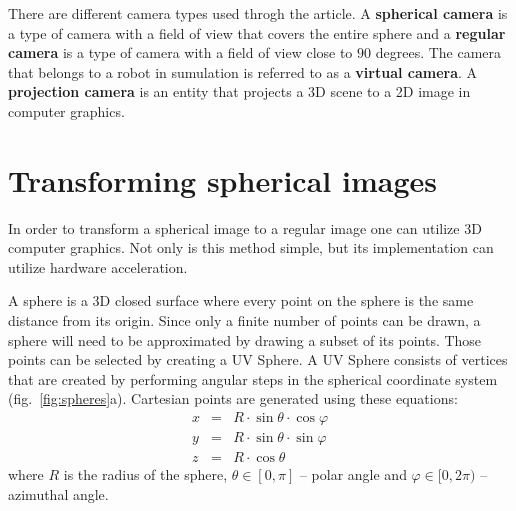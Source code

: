 \documentclass{svproc}
\begin{document}
There are different camera types used throgh the article. A \textbf{spherical camera} is a type of camera with a field of view that covers the entire sphere and a \textbf{regular camera} is a type of camera with a field of view close to $90$ degrees.
The camera that belongs to a robot in sumulation is referred to as a \textbf{virtual camera}.
A \textbf{projection camera} is an entity that projects a 3D scene to a 2D image in computer graphics.




\section{Transforming spherical images}
\label{sec:spherical}

In order to transform a spherical image to a regular image one can utilize 3D computer graphics.
Not only is this method simple, but its implementation can utilize hardware acceleration.

A sphere is a 3D closed surface where every point on the sphere is the same distance from its origin.
Since only a finite number of points can be drawn, a sphere will need to be approximated by drawing a subset of its points.
Those points can be selected by creating a UV Sphere.
A UV Sphere consists of vertices that are created by performing angular steps in the spherical coordinate system (fig.~\ref{fig:spheres}a).
Cartesian points are generated using these equations:
\begin{eqnarray}
    x &=& R \cdot \sin \theta \cdot \cos \varphi \nonumber \\
    y &=& R \cdot \sin \theta \cdot \sin \varphi \\
    z &=& R \cdot \cos \theta \nonumber
\end{eqnarray}
where $R$ is the radius of the sphere, $\theta \in [0, \pi]$ -- polar angle and $\varphi \in [0, 2\pi)$ -- azimuthal angle.
\end{document}
